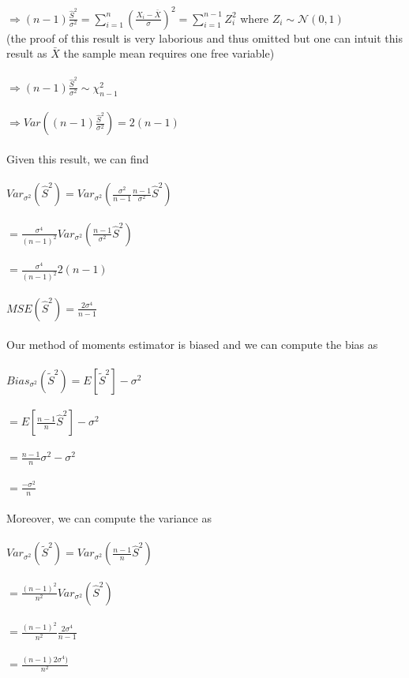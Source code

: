 \documentclass{article}
\begin{document}
$\Rightarrow(n-1)\frac{\hat{S}^2}{\sigma^2}=\sum_{i=1}^n(\frac{X_i-\bar{X}}{\sigma})^2=\sum_{i=1}^{n-1}Z_i^2$ where $Z_i\sim\mathcal{N}(0,1)$\\ (the proof of this result is very laborious and thus omitted but one can intuit this result as $\bar{X}$ the sample mean requires one free variable)\\\\
$\Rightarrow(n-1)\frac{\hat{S}^2}{\sigma^2}\sim\chi_{n-1}^2$\\\\
$\Rightarrow Var((n-1)\frac{\hat{S}^2}{\sigma^2})=2(n-1)$\\\\
Given this result, we can find\\\\
$Var_{\sigma^2}(\hat{S}^2)=Var_{\sigma^2}(\frac{\sigma^2}{n-1}\frac{n-1}{\sigma^2}\hat{S}^2)$\\\\
$=\frac{\sigma^4}{(n-1)^2}Var_{\sigma^2}(\frac{n-1}{\sigma^2}\hat{S}^2)$\\\\
$=\frac{\sigma^4}{(n-1)^2}2(n-1)$\\\\
$MSE(\hat{S}^2)=\frac{2\sigma^4}{n-1}$\\\\
Our method of moments estimator is biased and we can compute the bias as\\\\
$Bias_{\sigma^2}(\tilde{S}^2)=E[\tilde{S}^2]-\sigma^2$\\\\
$=E[\frac{n-1}{n}\hat{S}^2]-\sigma^2$\\\\
$=\frac{n-1}{n}\sigma^2-\sigma^2$\\\\
$=\frac{-\sigma^2}{n}$\\\\
Moreover, we can compute the variance as\\\\
$Var_{\sigma^2}(\tilde{S}^2)=Var_{\sigma^2}(\frac{n-1}{n}\hat{S}^2)$\\\\
$=\frac{(n-1)^2}{n^2}Var_{\sigma^2}(\hat{S}^2)$\\\\
$=\frac{(n-1)^2}{n^2}\frac{2\sigma^4}{n-1}$\\\\
$=\frac{(n-1)2\sigma^4)}{n^2}$\\\\
\end{document}
